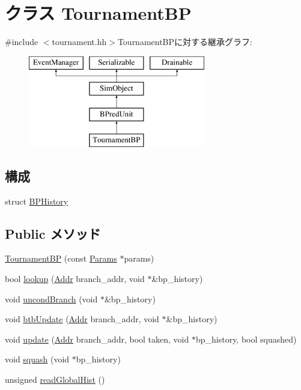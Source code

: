 \hypertarget{classTournamentBP}{
\section{クラス TournamentBP}
\label{classTournamentBP}
}


{\ttfamily \#include $<$tournament.hh$>$}TournamentBPに対する継承グラフ:\begin{figure}[H]
\begin{center}
\leavevmode
\includegraphics[height=4cm]{classTournamentBP}
\end{center}
\end{figure}
\subsection*{構成}
\begin{DoxyCompactItemize}
\item 
struct \hyperlink{structTournamentBP_1_1BPHistory}{BPHistory}
\end{DoxyCompactItemize}
\subsection*{Public メソッド}
\begin{DoxyCompactItemize}
\item 
\hyperlink{classTournamentBP_ad2381a9dbad94a16f6413cf1d69b1ce1}{TournamentBP} (const \hyperlink{classBPredUnit_aa715df0f49f029439cca4c7bd6e3d4fb}{Params} $\ast$params)
\item 
bool \hyperlink{classTournamentBP_a9c30d728e49473b5a3825835e98a10bc}{lookup} (\hyperlink{base_2types_8hh_af1bb03d6a4ee096394a6749f0a169232}{Addr} branch\_\-addr, void $\ast$\&bp\_\-history)
\item 
void \hyperlink{classTournamentBP_ad3d898a5eab93d923a1073fe6a0f0030}{uncondBranch} (void $\ast$\&bp\_\-history)
\item 
void \hyperlink{classTournamentBP_a101ada238eecd07cc6905c60272e2693}{btbUpdate} (\hyperlink{base_2types_8hh_af1bb03d6a4ee096394a6749f0a169232}{Addr} branch\_\-addr, void $\ast$\&bp\_\-history)
\item 
void \hyperlink{classTournamentBP_a590e0fd17d5b663e25f0e956fadc7062}{update} (\hyperlink{base_2types_8hh_af1bb03d6a4ee096394a6749f0a169232}{Addr} branch\_\-addr, bool taken, void $\ast$bp\_\-history, bool squashed)
\item 
void \hyperlink{classTournamentBP_aeb215cee5cdccdf52d02b73fffe80220}{squash} (void $\ast$bp\_\-history)
\item 
unsigned \hyperlink{classTournamentBP_a0024022d02f61b8c4166f8ea91c0e112}{readGlobalHist} ()
\end{DoxyCompactItemize}
